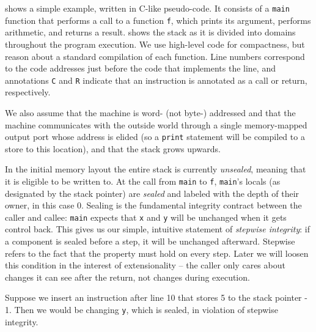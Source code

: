 \documentclass[acmsmall,review,anonymous]{acmart}\settopmatter{printfolios=true,printccs=false,printacmref=false}
\begin{document}
 shows a simple example, written in C-like pseudo-code.
It consists of a {\tt main} function that performs a call to a function {\tt f},
which prints its argument, performs arithmetic, and returns a result.
 shows the stack as it is divided into domains throughout
the program execution. We use high-level code for compactness, but reason about
a standard compilation of each function. 
Line numbers correspond to the code
addresses just before the code that implements the line, and annotations
{\tt C} and {\tt R} indicate that an instruction is annotated as a call or
return, respectively.

We also assume that the machine is word- (not byte-) addressed and that the
machine communicates with the outside world through a single memory-mapped
output port whose address is elided (so a {\tt print} statement will be
compiled to a store to this location), and that the stack grows upwards.

In the initial memory layout the entire stack is currently {\em unsealed},
meaning that it is eligible to be written to. At the call from {\tt main} to
{\tt f}, {\tt main}'s locals (as designated  by the stack pointer) are
{\em sealed} and labeled with the depth of their owner, in this case 0.
Sealing is the fundamental integrity contract between the caller and callee:
{\tt main} expects that {\tt x} and {\tt y} will be unchanged when it gets control back.
This gives us our simple, intuitive statement of {\em stepwise integrity}:
if a component is sealed before a step, it will be unchanged afterward. Stepwise
refers to the fact that the property must hold on every step. Later we will
loosen this condition in the interest of extensionality -- the caller only
cares about changes it can see after the return, not changes during execution.

Suppose we insert an instruction after line 10 that stores 5 to the stack pointer - 1.
Then we would be changing {\tt y}, which is sealed, in violation of stepwise integrity.
\end{document}
